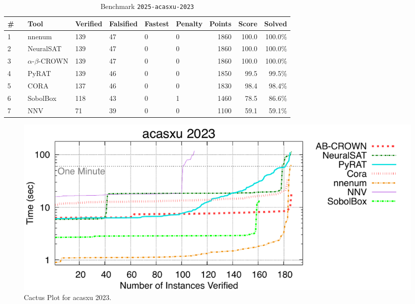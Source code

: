 
\clearpage

\begin{table}[h]
\begin{center}
\caption{Benchmark \texttt{2025-acasxu-2023}} \label{tab:cat_2025_acasxu_2023}
{\setlength{\tabcolsep}{2pt}
\begin{tabular}[h]{@{}llllllrrr@{}}
\toprule
\textbf{\# ~} & \textbf{Tool} & \textbf{Verified} & \textbf{Falsified} & \textbf{Fastest} & \textbf{Penalty} & \textbf{Points} & \textbf{Score} & \textbf{Solved}\\
\midrule
1 & nnenum & 139 & 47 & 0 & 0 & 1860 & 100.0 & 100.0\% \\
2 & NeuralSAT & 139 & 47 & 0 & 0 & 1860 & 100.0 & 100.0\% \\
3 & $\alpha$-$\beta$-CROWN & 139 & 47 & 0 & 0 & 1860 & 100.0 & 100.0\% \\
4 & PyRAT & 139 & 46 & 0 & 0 & 1850 & 99.5 & 99.5\% \\
5 & CORA & 137 & 46 & 0 & 0 & 1830 & 98.4 & 98.4\% \\
6 & SobolBox & 118 & 43 & 0 & 1 & 1460 & 78.5 & 86.6\% \\
7 & NNV & 71 & 39 & 0 & 0 & 1100 & 59.1 & 59.1\% \\
\bottomrule
\end{tabular}
}
\end{center}
\end{table}



\begin{figure}[h]
\centerline{\includegraphics[width=\textwidth]{cactus/2025_acasxu_2023.pdf}}
\caption{Cactus Plot for acasxu 2023.}
\label{fig:quantPic}
\end{figure}


\clearpage

